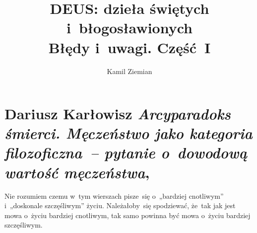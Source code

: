 \documentclass[a4paper,11pt]{article}
\title{DEUS: dzieła świętych i~błogosławionych \\
  {\Large Błędy i~uwagi. Część~I}}
\author{Kamil Ziemian}
\numberwithin{equation}{section}
\begin{document}





\maketitle  %













\section{Dariusz Karłowisz
  \textit{Arcyparadoks śmierci. Męczeństwo jako kategoria
    filozoficzna~-- pytanie o~dowodową wartość męczeństwa},
  \cite{KarlowiczArcyparadoksSmierci2021}}





\vspace{0em}


\noindent
{} Nie rozumiem czemu w~tym wierszach pisze~się
o~„bardziej
cnotliwym” i~„doskonale szczęśliwym” życiu. Należałoby~się spodziewać,
że~tak jak jest mowa o~życiu bardziej cnotliwym, tak samo powinna być mowa
o~życiu bardziej szczęśliwym.

\VerSpaceFour
\end{document}
